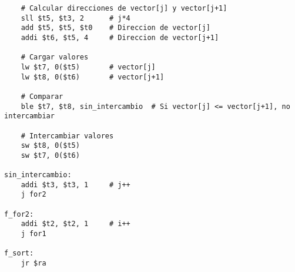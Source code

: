 \documentclass{article}
\begin{document}
\begin{lstlisting}
    # Calcular direcciones de vector[j] y vector[j+1]
    sll $t5, $t3, 2      # j*4
    add $t5, $t5, $t0    # Direccion de vector[j]
    addi $t6, $t5, 4     # Direccion de vector[j+1]
    
    # Cargar valores
    lw $t7, 0($t5)       # vector[j]
    lw $t8, 0($t6)       # vector[j+1]
    
    # Comparar
    ble $t7, $t8, sin_intercambio  # Si vector[j] <= vector[j+1], no intercambiar
    
    # Intercambiar valores
    sw $t8, 0($t5)
    sw $t7, 0($t6)
    
sin_intercambio:
    addi $t3, $t3, 1     # j++
    j for2
    
f_for2:
    addi $t2, $t2, 1     # i++
    j for1
    
f_sort:
    jr $ra

\end{lstlisting}
\end{document}
